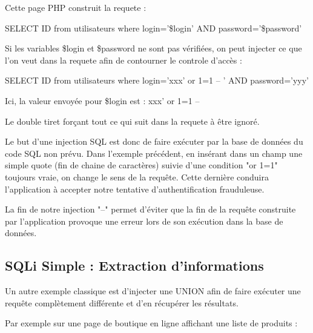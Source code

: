 \begin{tabbing}
\end{tabbing}
Cette page PHP construit la requete :
\begin{tabbing}
\end{tabbing}
SELECT ID from utilisateurs where login='\$login' AND password='\$password'

\begin{tabbing}
\end{tabbing}
Si les variables \$login et \$password ne sont pas vérifiées, on peut injecter ce que l'on veut dans la requete afin de contourner le controle d'accès :
\begin{tabbing}
\end{tabbing}
SELECT ID from utilisateurs where login='xxx' or 1=1 -- ' AND password='yyy'

\begin{tabbing}
\end{tabbing}
Ici, la valeur envoyée pour \$login est :
xxx' or 1=1 --

\begin{tabbing}
\end{tabbing}
Le double tiret forçant tout ce qui suit dans la requete à être ignoré.

Le but d'une injection SQL est donc de faire exécuter par la base de données du code SQL non prévu. Dans l'exemple précédent, en insérant dans un champ une simple quote (fin de chaine de caractères) suivie d'une condition "or 1=1" toujours vraie, on change le sens de la requête. Cette dernière conduira l'application à accepter notre tentative d'authentification frauduleuse.

La fin de notre injection "--" permet d'éviter que la fin de la requête construite par l'application provoque une erreur lors de son exécution dans la base de données.

\subsection{SQLi Simple : Extraction d'informations}\label{vulnerabilites:web:sqli:simpleextract}

Un autre exemple classique est d'injecter une UNION afin de faire exécuter une requête complètement différente et d'en récupérer les résultats.

Par exemple sur une page de boutique en ligne affichant une liste de produits :
\begin{tabbing}
\end{tabbing}

